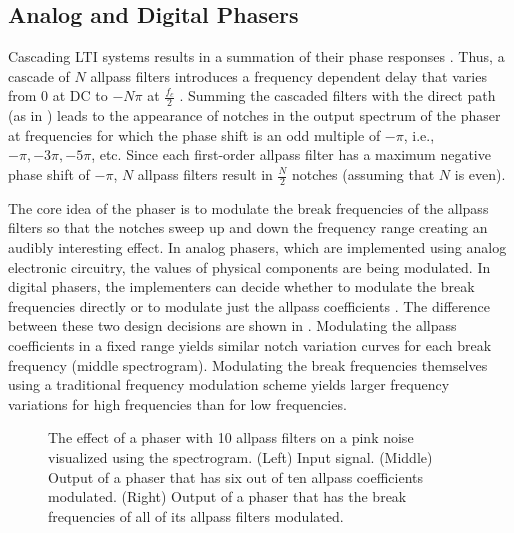 \subsection{Analog and Digital Phasers}

Cascading \ac{LTI} systems results in a summation of their phase responses \cite{Oppenheim1997}. Thus, a cascade of $N$ allpass filters introduces a frequency dependent delay that varies from 0 at DC to $-N\pi$ at $\frac{f_c}{2}$ \cite{PASPWEB2010}. Summing the cascaded filters with the direct path (as in ) leads to the appearance of notches in the output spectrum of the phaser at frequencies for which the phase shift is an odd multiple of $-\pi$, i.e., $-\pi, -3\pi, -5\pi$, etc. Since each first-order allpass filter has a maximum negative phase shift of $-\pi$, $N$ allpass filters result in $\frac{N}{2}$ notches (assuming that $N$ is even).

The core idea of the phaser is to modulate the break frequencies of the allpass filters so that the notches sweep up and down the frequency range creating an audibly interesting effect. In analog phasers, which are implemented using analog electronic circuitry, the values of physical components are being modulated. In digital phasers, the implementers can decide whether to modulate the break frequencies directly or to modulate just the allpass coefficients \cite{Kiiski2016}. The difference between these two design decisions are shown in . Modulating the allpass coefficients in a fixed range yields similar notch variation curves for each break frequency (middle spectrogram). Modulating the break frequencies themselves using a traditional frequency modulation scheme yields larger frequency variations for high frequencies than for low frequencies.

\newcommand{\scaleboxsize}{0.6}
\newcommand{\subfigurewidththree}{0.3\textwidth}
\begin{figure}
    \begin{subfigure}{0.33\textwidth}
        \centering
        \scalebox{\scaleboxsize}{}
    \end{subfigure}
    \begin{subfigure}{0.28\textwidth}
        \centering
        \scalebox{\scaleboxsize}{}
    \end{subfigure}
    \begin{subfigure}{0.34\textwidth}
        \centering
        \scalebox{0.61}{}
    \end{subfigure}
    \caption{The effect of a phaser with 10 allpass filters on a pink noise visualized using the spectrogram. (Left) Input signal. (Middle) Output of a phaser that has six out of ten allpass coefficients modulated. (Right) Output of a phaser that has the break frequencies of all of its allpass filters modulated.}
    \label{fig:pink_noise_phasered}
\end{figure}

